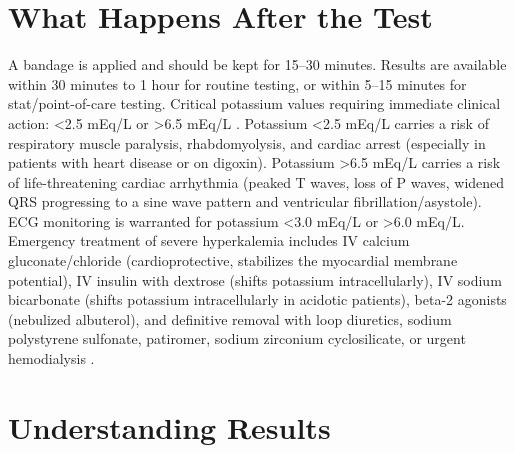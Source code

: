 \section*{What Happens After the Test}
A bandage is applied and should be kept for 15--30 minutes. Results are available within 30 minutes to 1 hour for routine testing, or within 5--15 minutes for stat/point-of-care testing. Critical potassium values requiring immediate clinical action: <2.5 mEq/L or >6.5 mEq/L \cite{wallach2022interpretation}. Potassium <2.5 mEq/L carries a risk of respiratory muscle paralysis, rhabdomyolysis, and cardiac arrest (especially in patients with heart disease or on digoxin). Potassium >6.5 mEq/L carries a risk of life-threatening cardiac arrhythmia (peaked T waves, loss of P waves, widened QRS progressing to a sine wave pattern and ventricular fibrillation/asystole). ECG monitoring is warranted for potassium <3.0 mEq/L or >6.0 mEq/L. Emergency treatment of severe hyperkalemia includes IV calcium gluconate/chloride (cardioprotective, stabilizes the myocardial membrane potential), IV insulin with dextrose (shifts potassium intracellularly), IV sodium bicarbonate (shifts potassium intracellularly in acidotic patients), beta-2 agonists (nebulized albuterol), and definitive removal with loop diuretics, sodium polystyrene sulfonate, patiromer, sodium zirconium cyclosilicate, or urgent hemodialysis \cite{kovesdy2017updates}.

\section*{Understanding Results}

